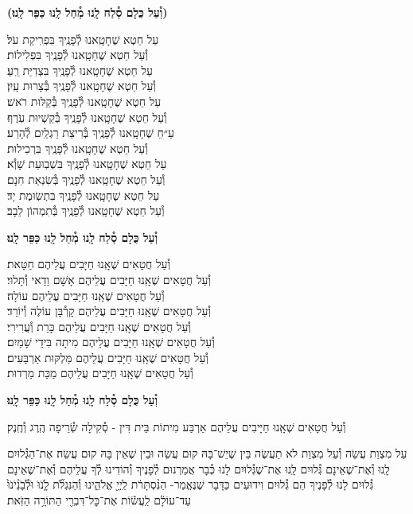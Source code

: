 \documentclass[twoside, openany, parskip=half, 11pt]{book}
\begin{document}
\textbf{(וְ֯עַל כֻּלָם סְ֯לַח לָֽנוּ מְ֯חַל לָֽנוּ כַּפֵּר לָֽנוּ׃)}

עַל חֵטְא שֶׁחָטָֽאנוּ לְ֯פָנֶֽיךָ בִּפְרִֽיקַת עֹל׃\\ וְ֯עַל חֵטְא שֶׁחָטָֽאנוּ לְ֯פָנֶֽיךָ בִּפְלִילוֹת׃ \\
עַל חֵטְא שֶׁחָטָֽאנוּ לְ֯פָנֶֽיךָ בִּצְדִיַּת רֵֽעַ׃ \\ וְ֯עַל חֵטְא שֶׁחָטָֽאנוּ לְ֯פָנֶֽיךָ בְּ֯צָרוּת עָֽיִן׃ \\
עַל חֵטְא שֶׁחָטָֽאנוּ לְ֯פָנֶֽיךָ בְּ֯קַלּוּת רֹאשׁ׃\\ וְ֯עַל חֵטְא שֶׁחָטָֽאנוּ לְ֯פָנֶֽיךָ בְּ֯קַשְׁיוּת עֹֽרֶף׃ \\
עַ״חֵ שֶׁחָטָֽאנוּ לְ֯פָנֶֽיךָ בְּ֯רִיצַת רַגְלַֽיִם לְ֯הָרַע׃\\ וְ֯עַל חֵטְא שֶׁחָטָֽאנוּ לְ֯פָנֶֽיךָ בִּרְכִילוּת׃ \\
עַל חֵטְא שֶׁחָטָֽאנוּ לְ֯פָנֶֽיךָ בִּשְׁבֽוּעַת שָׁוְ֯א׃ \\ וְ֯עַל חֵטְא שֶׁחָטָֽאנוּ לְ֯פָנֶֽיךָ בְּ֯שִׂנְאַת חִנָם׃ \\
עַל חֵטְא שֶׁחָטָֽאנוּ לְ֯פָנֶֽיךָ בִּתְשֽׂוּמֶת יָד׃\\ וְ֯עַל חֵטְא שֶׁחָטָֽאנוּ לְ֯פָנֶֽיךָ בְּ֯תִמְהוֹן לֵבָב׃

\textbf{וְ֯עַל כֻּלָם סְ֯לַח לָֽנוּ מְ֯חַל לָֽנוּ כַּפֵּר לָֽנוּ׃}


וְ֯עַל חֲטָאִים שֶׁאָֽנוּ חַיָּבִים עֲלֵיהֶם חַטָּאת׃\\
וְ֯עַל חֲטָאִים שֶׁאָֽנוּ חַיָּבִים עֲלֵיהֶם אָשָׁם וַדַאי וְ֯תָּלוּי׃\\
וְ֯עַל חֲטָאִים שֶׁאָֽנוּ חַיָּבִים עֲלֵיהֶם עוֹלָה׃\\
וְ֯עַל חֲטָאִים שֶׁאָֽנוּ חַיָּבִים עֲלֵיהֶם קָרְ֯בָּן עוֹלֶה וְ֯יוֹרֵד׃\\
וְ֯עַל חֲטָאִים שֶׁאָֽנוּ חַיָּבִים עֲלֵיהֶם כָּרֵת וְ֯עֲרִירִי׃\\
וְ֯עַל חֲטָאִים שֶׁאָֽנוּ חַיָּבִים עֲלֵיהֶם מִיתָה בִּידֵי שָׁמַיִם׃\\
וְ֯עַל חֲטָאִים שֶׁאָֽנוּ חַיָּבִים עֲלֵיהֶם מַּלְקּוּת אַרְבָּעִים׃\\
וְ֯עַל חֲטָאִים שֶׁאָֽנוּ חַיָּבִים עֲלֵיהֶם מַכַּת מַרְדוּת׃



\textbf{וְ֯עַל כֻּלָם סְ֯לַח לָֽנוּ מְ֯חַל לָֽנוּ כַּפֵּר לָֽנוּ׃}

וְ֯עַל חֲטָאִים שֶׁאָֽנוּ חַיָּיבִים עֲלֵיהֶם אַרְבַּע מִיתוֹת בֵּית דִּין - סְ֯קִילָה שְׂ֯רֵיפָה הֶֽרֶג וְ֯חֶֽנֶק׃

עַל מִצְוַת עֲשֵׂה וְ֯עַל מִצְוַת לֹא תַעֲשֶׂה בֵּין שֶׁיֵשׁ־בָּהּ קוּם עֲשֵׂה וּבֵין שֶׁאֵין בָּהּ קוּם עֲשֵׂה׃ אֶת־הַגְּ֯לוּיִם לָֽנוּ וְ֯אֶת־שֶׁאֵינָם גְּ֯לוּיִם לָֽנוּ אֶת־שֶׁגְּ֯לוּיִם לָנוּ כְּ֯בָר אֲמַרְנוּם לְ֯פָנֶיךָ וְ֯הוֹדִינוּ לְ֯ךָ עֲלֵיהֶם וְ֯אֶת־שֶׁאֵינָם גְּ֯לוּיִם לָנוּ לְ֯פָנֶיךָ הֵם גְּ֯לוּיִם וִידוּעִים כַּדָּבָר שֶׁנֶּאֱמַר- הַנִּ֨סְתָּרֹ֔ת
לַֽיְיָ֖ אֱלֹהֵ֑ינוּ וְ֯הַנִּגְלֹ֞ת לָֹ֤נֹוֹּ וֹּלְֹ֯בָֹנֵֹ֨יֹנֹוֹּ֙ עַד־עוֹלָ֔ם לַֽעֲשׂ֕וֹת אֶת־כׇּל־דִּבְרֵ֖י הַתּוֹרָ֥ה הַזֹּֽאת׃
\end{document}
